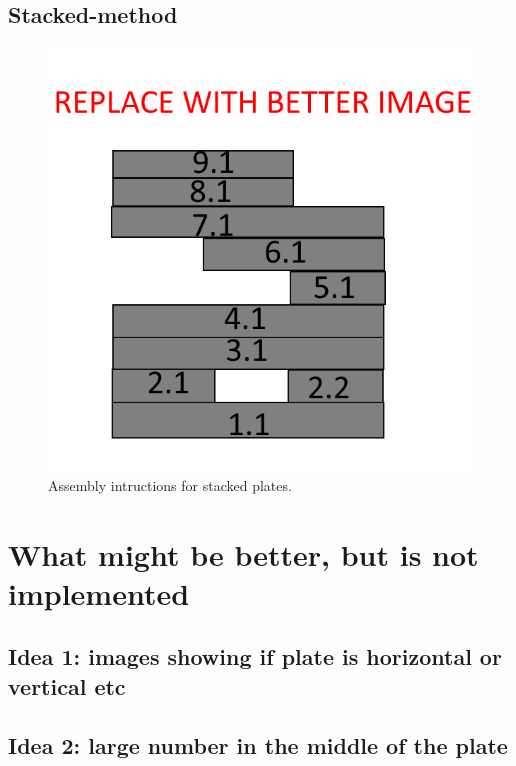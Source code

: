 \documentclass[../ClassicThesis.tex]{subfiles}
\begin{document}
\subsection{Stacked-method}\label{sub:assemblystacked}

\begin{figure}
    \centering
    \includegraphics[width=0.5\columnwidth]{Images/assembly_stacked.png}
    \caption{Assembly intructions for stacked plates.}
    \label{fig:assemblystacked}
\end{figure}




\section{What might be better, but is not implemented}\label{sec:assemblyimprovements}
\subsection{Idea 1: images showing if plate is horizontal or vertical etc}
\subsection{Idea 2: large number in the middle of the plate}
\end{document}
